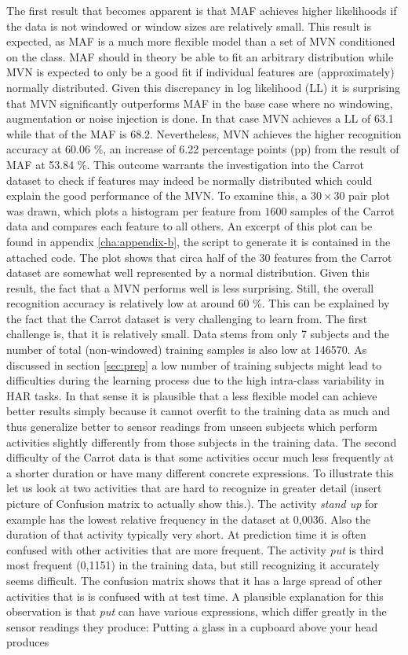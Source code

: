 \documentclass[11pt,titlepage,oneside,openany]{book}
\begin{document}
The first result that becomes apparent is that MAF achieves higher likelihoods if the data is not windowed or window sizes are relatively small. This result is expected, as MAF is a much more flexible model than a set of MVN conditioned on the class. MAF should in theory be able to fit an arbitrary distribution while MVN is expected to only be a good fit if individual features are (approximately) normally distributed. Given this discrepancy in log likelihood (LL) it is surprising that MVN significantly outperforms MAF in the base case where no windowing, augmentation or noise injection is done. In that case MVN achieves a LL of 63.1 while that of the MAF is 68.2. Nevertheless, MVN achieves the higher recognition accuracy at 60.06 \%, an increase of 6.22 percentage points (pp) from the result of MAF at 53.84 \%. This outcome warrants the investigation into the Carrot dataset to check if features may indeed be normally distributed which could explain the good performance of the MVN. To examine this, a $30 \times 30$ pair plot was drawn, which plots a histogram per feature from $1600$ samples of the Carrot data and compares each feature to all others. An excerpt of this plot can be found in appendix \ref{cha:appendix-b}, the script to generate it is contained in the attached code. The plot shows that circa half of the 30 features from the Carrot dataset are somewhat well represented by a normal distribution. Given this result, the fact that a MVN performs well is less surprising. Still, the overall recognition accuracy is relatively low at around 60 \%. This can be explained by the fact that the Carrot dataset is very challenging to learn from. The first challenge is, that it is relatively small. Data stems from only 7 subjects and the number of total (non-windowed) training samples is also low at 146570. As discussed in section \ref{sec:prep} a low number of training subjects might lead to difficulties during the learning process due to the high intra-class variability in HAR tasks. In that sense it is plausible that a less flexible model can achieve better results simply because it cannot overfit to the training data as much and thus generalize better to sensor readings from unseen subjects which perform activities slightly differently from those subjects in the training data. The second difficulty of the Carrot data is that some activities occur much less frequently at a shorter duration or have many different concrete expressions. To illustrate  this let us look at two activities that are hard to recognize in greater detail (insert picture of Confusion matrix to actually show this.). The activity \emph{stand up} for example has the lowest relative frequency in the dataset at 0,0036. Also the duration of that activity typically very short. At prediction time it is often confused with other activities that are more frequent. The activity \emph{put} is third most frequent (0,1151) in the training data, but still recognizing it accurately seems difficult. The confusion matrix shows that it has a large spread of other activities that is is confused with at test time. A plausible explanation for this observation is that \emph{put} can have various expressions, which differ greatly in the sensor readings they produce: Putting a glass in a cupboard above your head produces 
\end{document}
